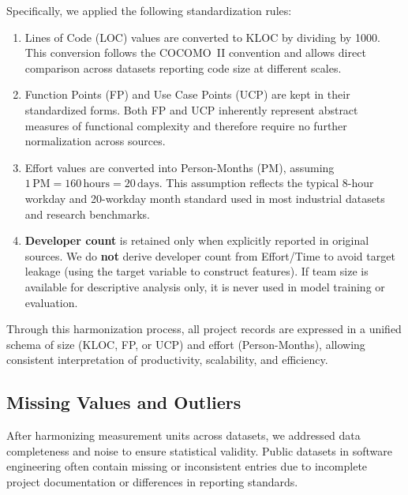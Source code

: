 \documentclass{ieeeaccess}
\begin{document}
Specifically, we applied the following standardization rules:
\begin{enumerate}[label=(\roman*), leftmargin=2em]
    \item Lines of Code (LOC) values are converted to KLOC by dividing by 1000. 
    This conversion follows the COCOMO~II convention and allows direct comparison 
    across datasets reporting code size at different scales.

    \item Function Points (FP) and Use Case Points (UCP) are kept in their standardized forms. 
    Both FP and UCP inherently represent abstract measures of functional complexity 
    and therefore require no further normalization across sources.

    \item Effort values are converted into Person-Months (PM), assuming 
    $1\,\text{PM} = 160\,\text{hours} = 20\,\text{days}$. 
    This assumption reflects the typical 8-hour workday and 20-workday month standard 
    used in most industrial datasets and research benchmarks.

    \item \textbf{Developer count} is retained only when explicitly reported in original sources. 
    We do \textbf{not} derive developer count from Effort/Time to avoid target leakage 
    (using the target variable to construct features). 
    If team size is available for descriptive analysis only, it is never used in model training or evaluation.
\end{enumerate}

Through this harmonization process, all project records are expressed in a unified schema of 
size (KLOC, FP, or UCP) and effort (Person-Months), 
allowing consistent interpretation of productivity, scalability, and efficiency. 



\subsection{Missing Values and Outliers}
After harmonizing measurement units across datasets, we addressed data completeness 
and noise to ensure statistical validity. Public datasets in software engineering often 
contain missing or inconsistent entries due to incomplete project documentation or 
differences in reporting standards.
\end{document}
